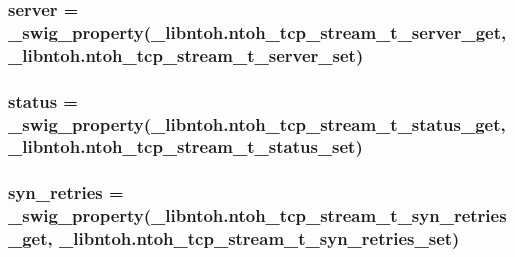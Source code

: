 \hypertarget{classlibntoh_1_1ntoh__tcp__stream__t_a3b90a824912f44140b739f0ddb0bbd84}{
\subsubsection[{server}]{ server = {\bf \-\_\-swig\-\_\-property}(\-\_\-libntoh.\-ntoh\-\_\-tcp\-\_\-stream\-\_\-t\-\_\-server\-\_\-get, \-\_\-libntoh.\-ntoh\-\_\-tcp\-\_\-stream\-\_\-t\-\_\-server\-\_\-set)\hspace{0.3cm}{\ttfamily [static]}}}\label{classlibntoh_1_1ntoh__tcp__stream__t_a3b90a824912f44140b739f0ddb0bbd84}
\hypertarget{classlibntoh_1_1ntoh__tcp__stream__t_ad7843c85abee4764c9e717a8db8cb3a5}{
\subsubsection[{status}]{ status = {\bf \-\_\-swig\-\_\-property}(\-\_\-libntoh.\-ntoh\-\_\-tcp\-\_\-stream\-\_\-t\-\_\-status\-\_\-get, \-\_\-libntoh.\-ntoh\-\_\-tcp\-\_\-stream\-\_\-t\-\_\-status\-\_\-set)\hspace{0.3cm}{\ttfamily [static]}}}\label{classlibntoh_1_1ntoh__tcp__stream__t_ad7843c85abee4764c9e717a8db8cb3a5}
\hypertarget{classlibntoh_1_1ntoh__tcp__stream__t_a01107768ed3836fe4c2f2072c1c789c6}{
\subsubsection[{syn\-\_\-retries}]{ syn\-\_\-retries = {\bf \-\_\-swig\-\_\-property}(\-\_\-libntoh.\-ntoh\-\_\-tcp\-\_\-stream\-\_\-t\-\_\-syn\-\_\-retries\-\_\-get, \-\_\-libntoh.\-ntoh\-\_\-tcp\-\_\-stream\-\_\-t\-\_\-syn\-\_\-retries\-\_\-set)\hspace{0.3cm}{\ttfamily [static]}}}\label{classlibntoh_1_1ntoh__tcp__stream__t_a01107768ed3836fe4c2f2072c1c789c6}

